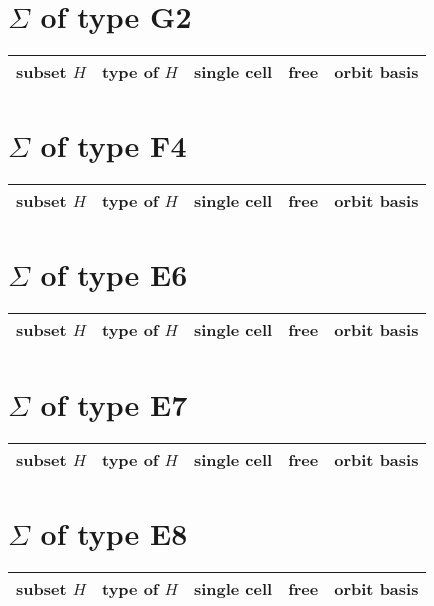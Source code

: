 \documentclass{article}
\newcommand{\resulttable}[1]{
  \section*{\(\Sigma\) of type #1}
\begin{longtable}{llccc}
  \toprule
    \textbf{subset \(H\)} & \textbf{type of \(H\)} & \parbox{3em}{\bf\centering single cell} & \textbf{free} & \parbox{3em}{\bf\centering orbit basis} \\
  \midrule
  
  \bottomrule
\end{longtable}
}
\begin{document}
\resulttable{G2}
\resulttable{F4}\newpage
\resulttable{E6}\newpage
\resulttable{E7}\newpage
\resulttable{E8}
\end{document}
